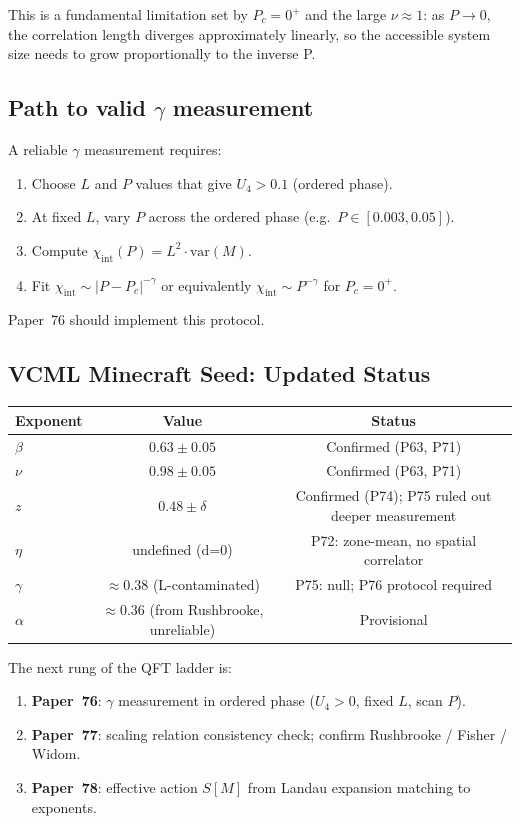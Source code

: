 \documentclass[12pt,a4paper]{article}
\begin{document}
This is a fundamental limitation set by $P_c = 0^+$ and the large $\nu \approx 1$: as
$P \to 0$, the correlation length diverges approximately linearly, so the accessible system
size needs to grow proportionally to the inverse P.

\subsection{Path to valid $\gamma$ measurement}

A reliable $\gamma$ measurement requires:
\begin{enumerate}
  \item Choose $L$ and $P$ values that give $U_4 > 0.1$ (ordered phase).
  \item At fixed $L$, vary $P$ across the ordered phase (e.g.\ $P \in [0.003, 0.05]$).
  \item Compute $\chi_\mathrm{int}(P) = L^2 \cdot \mathrm{var}(M)$.
  \item Fit $\chi_\mathrm{int} \sim |P - P_c|^{-\gamma}$ or equivalently $\chi_\mathrm{int} \sim P^{-\gamma}$
        for $P_c = 0^+$.
\end{enumerate}
Paper~76 should implement this protocol.

\subsection{VCML Minecraft Seed: Updated Status}

\begin{center}
\begin{tabular}{lcc}
\toprule
Exponent & Value & Status \\
\midrule
$\beta$  & $0.63\pm0.05$ & Confirmed (P63, P71) \\
$\nu$    & $0.98\pm0.05$ & Confirmed (P63, P71) \\
$z$      & $0.48\pm\delta$ & Confirmed (P74); P75 ruled out deeper measurement \\
$\eta$   & undefined (d=0) & P72: zone-mean, no spatial correlator \\
$\gamma$ & $\approx 0.38$ (L-contaminated) & P75: null; P76 protocol required \\
$\alpha$ & $\approx 0.36$ (from Rushbrooke, unreliable) & Provisional \\
\bottomrule
\end{tabular}
\end{center}

The next rung of the QFT ladder is:
\begin{enumerate}
  \item \textbf{Paper~76}: $\gamma$ measurement in ordered phase ($U_4>0$, fixed $L$, scan $P$).
  \item \textbf{Paper~77}: scaling relation consistency check; confirm Rushbrooke / Fisher / Widom.
  \item \textbf{Paper~78}: effective action $S[M]$ from Landau expansion matching to exponents.
\end{enumerate}
\end{document}
